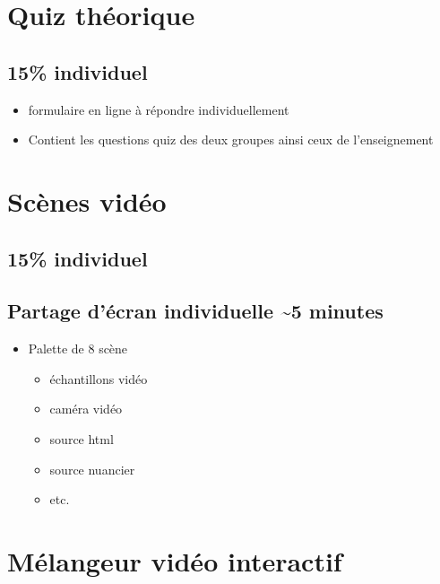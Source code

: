 \documentclass[
]{book}
\providecommand{\tightlist}{%
  \setlength{\itemsep}{0pt}\setlength{\parskip}{0pt}}
\begin{document}
\hypertarget{sommatif_3}{%
\section{Quiz théorique}\label{sommatif_3}}

\hypertarget{individuel-1}{%
\subsection{15\% individuel}\label{individuel-1}}

\begin{itemize}
\tightlist
\item
  formulaire en ligne à répondre individuellement
\item
  Contient les questions quiz des deux groupes ainsi ceux de l'enseignement
\end{itemize}

\hypertarget{sommatif_4}{%
\section{Scènes vidéo}\label{sommatif_4}}

\hypertarget{individuel-2}{%
\subsection{15\% individuel}\label{individuel-2}}

\hypertarget{partage-duxe9cran-individuelle-5-minutes}{%
\subsection{Partage d'écran individuelle \textasciitilde5 minutes}\label{partage-duxe9cran-individuelle-5-minutes}}

\begin{itemize}
\tightlist
\item
  Palette de 8 scène

  \begin{itemize}
  \tightlist
  \item
    échantillons vidéo
  \item
    caméra vidéo
  \item
    source html
  \item
    source nuancier
  \item
    etc.
  \end{itemize}
\end{itemize}

\hypertarget{sommatif_5}{%
\section{Mélangeur vidéo interactif}\label{sommatif_5}}
\end{document}
